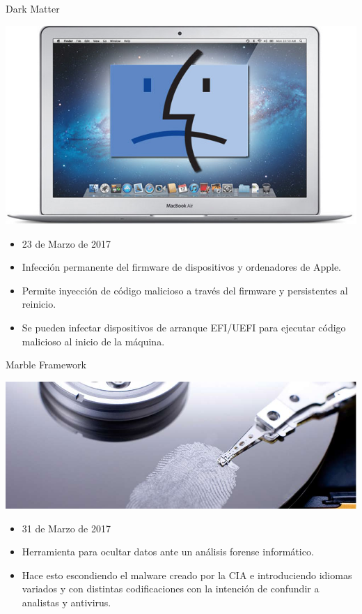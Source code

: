 \documentclass[10pt]{beamer}
\begin{document}
\begin{frame}{Dark Matter}
	\pause
	\begin{center}
		\includegraphics[scale=0.25]{./Imagenes/dark-matter.jpg}
	\end{center}
	\pause
	\begin{itemize}
		\item 23 de Marzo de 2017
		\pause
		\item Infección permanente del firmware de dispositivos y ordenadores de Apple.
		\pause
		\item Permite inyección de código malicioso a través del firmware y persistentes al reinicio.
		\pause
		\item Se pueden infectar dispositivos de arranque EFI/UEFI para ejecutar código malicioso al inicio de la máquina.
	\end{itemize}	
\end{frame}

\begin{frame}{Marble Framework}
	\pause
	\begin{center}
		\includegraphics[scale=0.25]{./Imagenes/marble-framework.jpg}
	\end{center}
	\pause
	\begin{itemize}
		\item 31 de Marzo de 2017
		\pause
		\item Herramienta para ocultar datos ante un análisis forense informático.
		\pause
		\item Hace esto escondiendo el malware creado por la CIA e introduciendo idiomas variados y con distintas codificaciones con la intención de confundir a analistas y antivirus.
	\end{itemize}
\end{frame}
\end{document}
